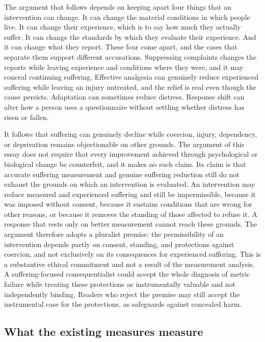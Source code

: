 \documentclass[11pt]{article}
\begin{document}
The argument that follows depends on keeping apart four things that an intervention can change. It can change the material conditions in which people live. It can change their experience, which is to say how much they actually suffer. It can change the standards by which they evaluate their experience. And it can change what they report. These four come apart, and the cases that separate them support different accusations. Suppressing complaints changes the reports while leaving experience and conditions where they were, and it may conceal continuing suffering. Effective analgesia can genuinely reduce experienced suffering while leaving an injury untreated, and the relief is real even though the cause persists. Adaptation can sometimes reduce distress. Response shift can alter how a person uses a questionnaire without settling whether distress has risen or fallen.

It follows that suffering can genuinely decline while coercion, injury, dependency, or deprivation remains objectionable on other grounds. The argument of this essay does not require that every improvement achieved through psychological or biological change be counterfeit, and it makes no such claim. Its claim is that accurate suffering measurement and genuine suffering reduction still do not exhaust the grounds on which an intervention is evaluated. An intervention may reduce measured and experienced suffering and still be impermissible, because it was imposed without consent, because it sustains conditions that are wrong for other reasons, or because it removes the standing of those affected to refuse it. A response that rests only on better measurement cannot reach these grounds. The argument therefore adopts a pluralist premise: the permissibility of an intervention depends partly on consent, standing, and protections against coercion, and not exclusively on its consequences for experienced suffering. This is a substantive ethical commitment and not a result of the measurement analysis. A suffering-focused consequentialist could accept the whole diagnosis of metric failure while treating these protections as instrumentally valuable and not independently binding. Readers who reject the premise may still accept the instrumental case for the protections, as safeguards against concealed harm.

\subsection{What the existing measures measure}
\end{document}
